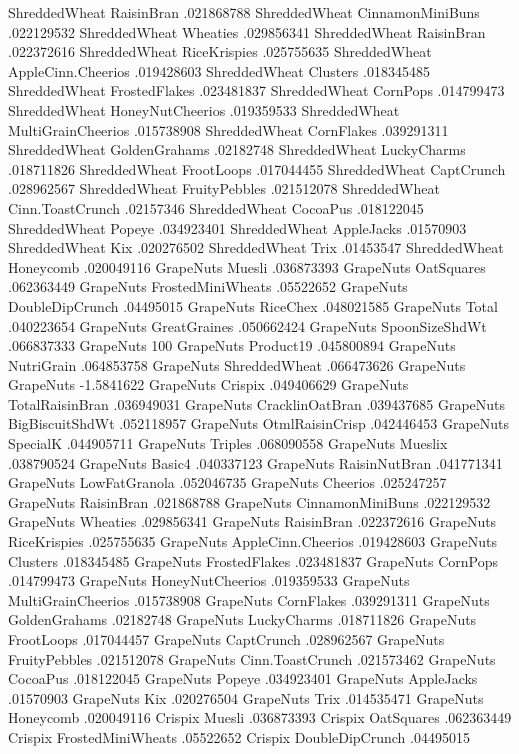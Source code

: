 ShreddedWheat	RaisinBran	.021868788
ShreddedWheat	CinnamonMiniBuns	.022129532
ShreddedWheat	Wheaties	.029856341
ShreddedWheat	RaisinBran	.022372616
ShreddedWheat	RiceKrispies	.025755635
ShreddedWheat	AppleCinn.Cheerios	.019428603
ShreddedWheat	Clusters	.018345485
ShreddedWheat	FrostedFlakes	.023481837
ShreddedWheat	CornPops	.014799473
ShreddedWheat	HoneyNutCheerios	.019359533
ShreddedWheat	MultiGrainCheerios	.015738908
ShreddedWheat	CornFlakes	.039291311
ShreddedWheat	GoldenGrahams	.02182748
ShreddedWheat	LuckyCharms	.018711826
ShreddedWheat	FrootLoops	.017044455
ShreddedWheat	CaptCrunch	.028962567
ShreddedWheat	FruityPebbles	.021512078
ShreddedWheat	Cinn.ToastCrunch	.02157346
ShreddedWheat	CocoaPus	.018122045
ShreddedWheat	Popeye	.034923401
ShreddedWheat	AppleJacks	.01570903
ShreddedWheat	Kix	.020276502
ShreddedWheat	Trix	.01453547
ShreddedWheat	Honeycomb	.020049116
GrapeNuts	Muesli	.036873393
GrapeNuts	OatSquares	.062363449
GrapeNuts	FrostedMiniWheats	.05522652
GrapeNuts	DoubleDipCrunch	.04495015
GrapeNuts	RiceChex	.048021585
GrapeNuts	Total	.040223654
GrapeNuts	GreatGraines	.050662424
GrapeNuts	SpoonSizeShdWt	.066837333
GrapeNuts	100%
GrapeNuts	Product19	.045800894
GrapeNuts	NutriGrain	.064853758
GrapeNuts	ShreddedWheat	.066473626
GrapeNuts	GrapeNuts	-1.5841622
GrapeNuts	Crispix	.049406629
GrapeNuts	TotalRaisinBran	.036949031
GrapeNuts	CracklinOatBran	.039437685
GrapeNuts	BigBiscuitShdWt	.052118957
GrapeNuts	OtmlRaisinCrisp	.042446453
GrapeNuts	SpecialK	.044905711
GrapeNuts	Triples	.068090558
GrapeNuts	Mueslix	.038790524
GrapeNuts	Basic4	.040337123
GrapeNuts	RaisinNutBran	.041771341
GrapeNuts	LowFatGranola	.052046735
GrapeNuts	Cheerios	.025247257
GrapeNuts	RaisinBran	.021868788
GrapeNuts	CinnamonMiniBuns	.022129532
GrapeNuts	Wheaties	.029856341
GrapeNuts	RaisinBran	.022372616
GrapeNuts	RiceKrispies	.025755635
GrapeNuts	AppleCinn.Cheerios	.019428603
GrapeNuts	Clusters	.018345485
GrapeNuts	FrostedFlakes	.023481837
GrapeNuts	CornPops	.014799473
GrapeNuts	HoneyNutCheerios	.019359533
GrapeNuts	MultiGrainCheerios	.015738908
GrapeNuts	CornFlakes	.039291311
GrapeNuts	GoldenGrahams	.02182748
GrapeNuts	LuckyCharms	.018711826
GrapeNuts	FrootLoops	.017044457
GrapeNuts	CaptCrunch	.028962567
GrapeNuts	FruityPebbles	.021512078
GrapeNuts	Cinn.ToastCrunch	.021573462
GrapeNuts	CocoaPus	.018122045
GrapeNuts	Popeye	.034923401
GrapeNuts	AppleJacks	.01570903
GrapeNuts	Kix	.020276504
GrapeNuts	Trix	.014535471
GrapeNuts	Honeycomb	.020049116
Crispix	Muesli	.036873393
Crispix	OatSquares	.062363449
Crispix	FrostedMiniWheats	.05522652
Crispix	DoubleDipCrunch	.04495015
